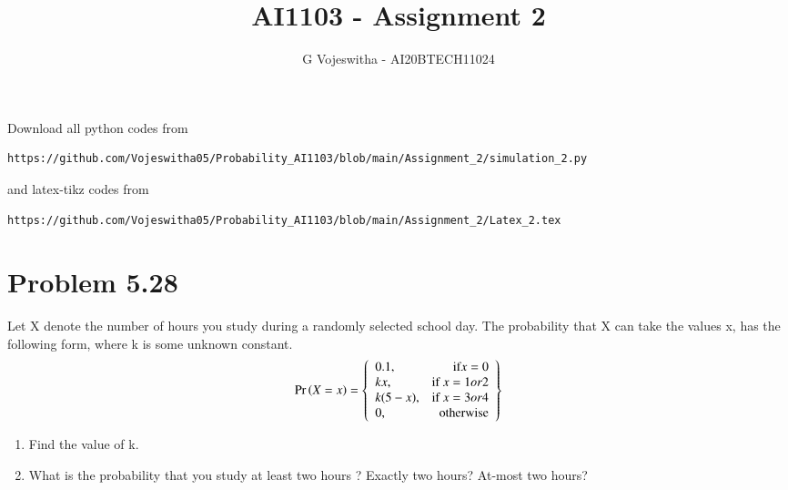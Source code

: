 \documentclass[journal,12pt,twocolumn]{IEEEtran}
\begin{document}
     \def\centbox#1{\makebox[0in]{#1}}
     \def\topbox#1{\raisebox{-\baselineskip}[0in][0in]{#1}}
     \def\midbox#1{\raisebox{-0.5\baselineskip}[0in][0in]{#1}}
\vspace{3cm}
\title{AI1103 - Assignment 2}
\author{G Vojeswitha - AI20BTECH11024}
\maketitle
\newpage
\bigskip
\renewcommand{\thefigure}{\theenumi}
\renewcommand{\thetable}{\theenumi}
Download all python codes from 
\begin{lstlisting}
https://github.com/Vojeswitha05/Probability_AI1103/blob/main/Assignment_2/simulation_2.py
\end{lstlisting}
%
and latex-tikz codes from 
%
\begin{lstlisting}
https://github.com/Vojeswitha05/Probability_AI1103/blob/main/Assignment_2/Latex_2.tex
\end{lstlisting}
\section{Problem 5.28}
Let X denote the number of hours you study during a randomly selected school day. The probability that X can take the values x, has the following form, where k is some unknown constant.
\begin{align}
\Pr\left(X = x\right) = \left\{\begin{array}{lr}
0.1, &\text{if} x = 0\\
kx, & \text{if } x = 1 or 2\\
k(5-x), & \text{if } x = 3 or 4\\
0, & \text{otherwise}
\end{array}\right\}
\end{align}
\begin{enumerate}[label={\alph*)}]
    \item  Find the value of k.
    \item  What is the probability that you study at least two hours ? Exactly two hours? At-most two hours?
\end{enumerate}
\end{document}
